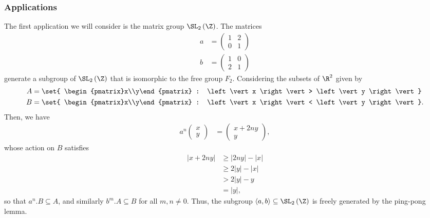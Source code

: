\documentclass[10pt]{mypackage}
\begin{document}
\subsubsection{Applications}%
The first application we will consider is the matrix group $\SL_2\left( \Z \right)$. The matrices
\begin{align*}
  a &= \begin{pmatrix}1 & 2 \\ 0 & 1\end{pmatrix}\\
  b &= \begin{pmatrix}1 & 0 \\ 2 & 1\end{pmatrix}
\end{align*}
generate a subgroup of $\SL_2\left( \Z \right)$ that is isomorphic to the free group $F_2$. Considering the subsets of $\R^2$ given by
\begin{align*}
  A &= \set{ \begin{pmatrix}x\\y\end{pmatrix} : \left\vert x \right\vert > \left\vert y \right\vert }\\
  B &= \set{ \begin{pmatrix}x\\y\end{pmatrix} : \left\vert x \right\vert < \left\vert y \right\vert }.
\end{align*}
Then, we have
\begin{align*}
  a^{n} \begin{pmatrix}x\\y\end{pmatrix} &= \begin{pmatrix}x + 2ny\\y\end{pmatrix},
\end{align*}
whose action on $B$ satisfies
\begin{align*}
  \left\vert x + 2ny \right\vert &\geq \left\vert 2ny \right\vert - \left\vert x \right\vert\\
                                 &\geq 2\left\vert y \right\vert-\left\vert x \right\vert\\
                                 &> 2\left\vert y \right\vert-y\\
                                 &= \left\vert y \right\vert,
\end{align*}
so that $a^{n}.B \subseteq A$, and similarly $b^{m}.A \subseteq B$ for all $m,n\neq 0$. Thus, the subgroup $\left\langle a,b \right\rangle\subseteq \SL_2\left( \Z \right)$ is freely generated by the ping-pong lemma.
\end{document}
